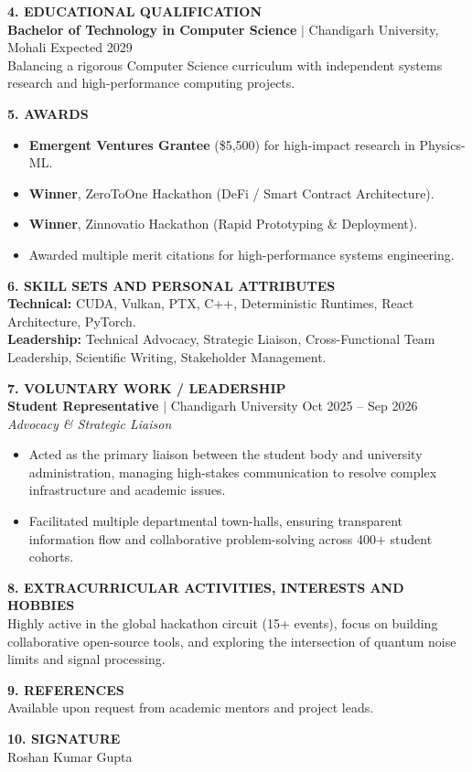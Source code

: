 \documentclass[10pt]{article}
\newcommand{\numberedsection}[2]{\vspace{2.5mm}\noindent\textbf{\large #1. #2}\vspace{1mm}}
\begin{document}
\numberedsection{4}{EDUCATIONAL QUALIFICATION} \\
\textbf{Bachelor of Technology in Computer Science} $|$ Chandigarh University, Mohali \hfill Expected 2029 \\
Balancing a rigorous Computer Science curriculum with independent systems research and high-performance computing projects.

\numberedsection{5}{AWARDS} \\
\begin{itemize}[noitemsep, topsep=0pt, leftmargin=15pt]
    \item \textbf{Emergent Ventures Grantee} (\$5,500) for high-impact research in Physics-ML.
    \item \textbf{Winner}, ZeroToOne Hackathon (DeFi / Smart Contract Architecture).
    \item \textbf{Winner}, Zinnovatio Hackathon (Rapid Prototyping \& Deployment).
    \item Awarded multiple merit citations for high-performance systems engineering.
\end{itemize}

\numberedsection{6}{SKILL SETS AND PERSONAL ATTRIBUTES} \\
\textbf{Technical:} CUDA, Vulkan, PTX, C++, Deterministic Runtimes, React Architecture, PyTorch. \\
\textbf{Leadership:} Technical Advocacy, Strategic Liaison, Cross-Functional Team Leadership, Scientific Writing, Stakeholder Management.

\numberedsection{7}{VOLUNTARY WORK / LEADERSHIP} \\
\textbf{Student Representative} $|$ Chandigarh University \hfill Oct 2025 -- Sep 2026 \\
\textit{Advocacy \& Strategic Liaison}
\begin{itemize}[noitemsep, topsep=2pt, leftmargin=15pt]
    \item Acted as the primary liaison between the student body and university administration, managing high-stakes communication to resolve complex infrastructure and academic issues.
    \item Facilitated multiple departmental town-halls, ensuring transparent information flow and collaborative problem-solving across 400+ student cohorts.
\end{itemize}

\numberedsection{8}{EXTRACURRICULAR ACTIVITIES, INTERESTS AND HOBBIES} \\
Highly active in the global hackathon circuit (15+ events), focus on building collaborative open-source tools, and exploring the intersection of quantum noise limits and signal processing.

\numberedsection{9}{REFERENCES} \\
Available upon request from academic mentors and project leads.

\numberedsection{10}{SIGNATURE} \\
\vspace{10mm}
\noindent Roshan Kumar Gupta
\end{document}
